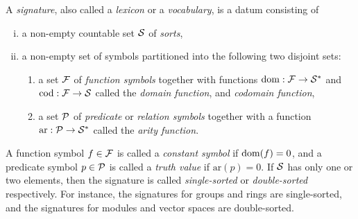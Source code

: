 \documentclass{../../large}
\begin{document}
\begin{prb}[Signatures]
A \emph{signature}, also called a \emph{lexicon} or a \emph{vocabulary}, is a datum consisting of
\begin{enumerate}[(i)]
\item a non-empty countable set $\mathcal{S}$ of \emph{sorts},
\item a non-empty set of symbols partitioned into the following two disjoint sets:
\begin{enumerate}[(\text{ii}.i)]
\item a set $\mathcal{F}$ of \emph{function symbols} together with functions $\mathrm{dom}:\mathcal{F}\to\mathcal{S}^*$ and $\mathrm{cod}:\mathcal{F}\to\mathcal{S}$ called the \emph{domain function}, and \emph{codomain function},
\item a set $\mathcal{P}$ of \emph{predicate} or \emph{relation symbols} together with a function $\mathrm{ar}:\mathcal{P}\to\mathcal{S}^*$ called the \emph{arity function}.
\end{enumerate}
\end{enumerate}
A function symbol $f\in\mathcal{F}$ is called a \emph{constant symbol} if $\operatorname{dom}(f)=0$, and a predicate symbol $p\in\mathcal{P}$ is called a \emph{truth value} if $\mathrm{ar}(p)=0$.
If $\mathcal{S}$ has only one or two elements, then the signature is called \emph{single-sorted} or \emph{double-sorted} respectively.
For instance, the signatures for groups and rings are single-sorted, and the signatures for modules and vector spaces are double-sorted.

\end{prb}
\end{document}
